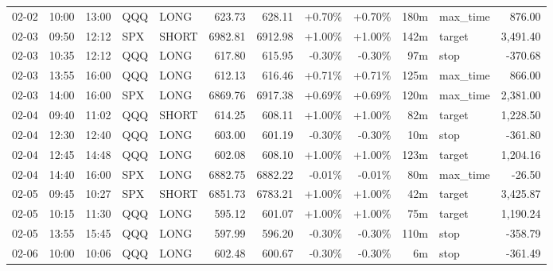\documentclass[11pt,a4paper,twoside]{article}
\begin{document}
\begin{center}
\begin{longtable}{>{\color{txtmain}}l l l l l r r r r r >{\color{txtmain}}l r}
02-02 & 10:00 & 13:00 & QQQ & LONG & 623.73 & 628.11 & \textcolor{wingreen}{+0.70\%} & \textcolor{wingreen}{+0.70\%} & 180m & max\_time & \textcolor{wingreen}{876.00} \\
02-03 & 09:50 & 12:12 & SPX & SHORT & 6982.81 & 6912.98 & \textcolor{wingreen}{+1.00\%} & \textcolor{wingreen}{+1.00\%} & 142m & target & \textcolor{wingreen}{3,491.40} \\
02-03 & 10:35 & 12:12 & QQQ & LONG & 617.80 & 615.95 & \textcolor{lossred}{-0.30\%} & \textcolor{lossred}{-0.30\%} & 97m & stop & \textcolor{lossred}{-370.68} \\
02-03 & 13:55 & 16:00 & QQQ & LONG & 612.13 & 616.46 & \textcolor{wingreen}{+0.71\%} & \textcolor{wingreen}{+0.71\%} & 125m & max\_time & \textcolor{wingreen}{866.00} \\
02-03 & 14:00 & 16:00 & SPX & LONG & 6869.76 & 6917.38 & \textcolor{wingreen}{+0.69\%} & \textcolor{wingreen}{+0.69\%} & 120m & max\_time & \textcolor{wingreen}{2,381.00} \\
02-04 & 09:40 & 11:02 & QQQ & SHORT & 614.25 & 608.11 & \textcolor{wingreen}{+1.00\%} & \textcolor{wingreen}{+1.00\%} & 82m & target & \textcolor{wingreen}{1,228.50} \\
02-04 & 12:30 & 12:40 & QQQ & LONG & 603.00 & 601.19 & \textcolor{lossred}{-0.30\%} & \textcolor{lossred}{-0.30\%} & 10m & stop & \textcolor{lossred}{-361.80} \\
02-04 & 12:45 & 14:48 & QQQ & LONG & 602.08 & 608.10 & \textcolor{wingreen}{+1.00\%} & \textcolor{wingreen}{+1.00\%} & 123m & target & \textcolor{wingreen}{1,204.16} \\
02-04 & 14:40 & 16:00 & SPX & LONG & 6882.75 & 6882.22 & \textcolor{lossred}{-0.01\%} & \textcolor{lossred}{-0.01\%} & 80m & max\_time & \textcolor{lossred}{-26.50} \\
02-05 & 09:45 & 10:27 & SPX & SHORT & 6851.73 & 6783.21 & \textcolor{wingreen}{+1.00\%} & \textcolor{wingreen}{+1.00\%} & 42m & target & \textcolor{wingreen}{3,425.87} \\
02-05 & 10:15 & 11:30 & QQQ & LONG & 595.12 & 601.07 & \textcolor{wingreen}{+1.00\%} & \textcolor{wingreen}{+1.00\%} & 75m & target & \textcolor{wingreen}{1,190.24} \\
02-05 & 13:55 & 15:45 & QQQ & LONG & 597.99 & 596.20 & \textcolor{lossred}{-0.30\%} & \textcolor{lossred}{-0.30\%} & 110m & stop & \textcolor{lossred}{-358.79} \\
02-06 & 10:00 & 10:06 & QQQ & LONG & 602.48 & 600.67 & \textcolor{lossred}{-0.30\%} & \textcolor{lossred}{-0.30\%} & 6m & stop & \textcolor{lossred}{-361.49} \\

\end{longtable}
\end{center}
\end{document}
